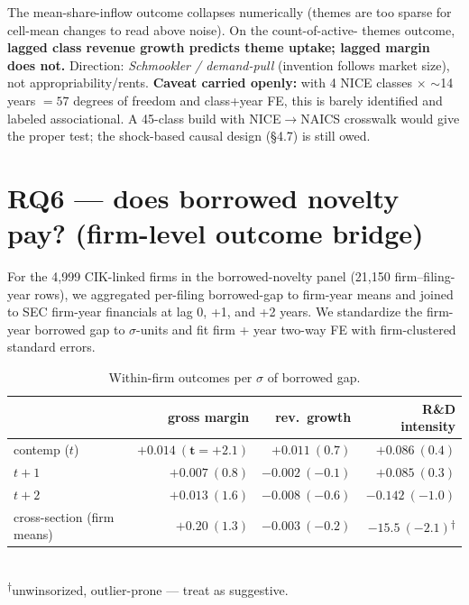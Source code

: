 \documentclass[11pt]{report}
\begin{document}
\noindent The mean-share-inflow outcome collapses numerically (themes are too
sparse for cell-mean changes to read above noise). On the count-of-active-
themes outcome, \textbf{lagged class revenue growth predicts theme uptake;
lagged margin does not.} Direction: \emph{Schmookler / demand-pull}
(invention follows market size), not appropriability/rents. \textbf{Caveat
carried openly:} with 4 NICE classes $\times$ $\sim$14 years $= 57$ degrees of
freedom and class+year FE, this is barely identified and labeled
associational. A 45-class build with NICE$\to$NAICS crosswalk would give the
proper test; the shock-based causal design (§4.7) is still owed.

\section{RQ6 --- does borrowed novelty pay? (firm-level outcome bridge)}
For the 4{,}999 CIK-linked firms in the borrowed-novelty panel (21{,}150
firm--filing-year rows), we aggregated per-filing borrowed-gap to firm-year
means and joined to SEC firm-year financials at lag 0, +1, and +2 years. We
standardize the firm-year borrowed gap to $\sigma$-units and fit firm + year
two-way FE with firm-clustered standard errors.

\begin{table}[h]\centering\small
\caption{Within-firm outcomes per $\sigma$ of borrowed gap.}
\begin{tabular}{lrrr}
\toprule
& gross margin & rev.\ growth & R\&D intensity \\
\midrule
contemp ($t$)   & $\mathbf{+0.014\ (t=+2.1)}$ & $+0.011\ (0.7)$ & $+0.086\ (0.4)$ \\
$t+1$           & $+0.007\ (0.8)$            & $-0.002\ (-0.1)$& $+0.085\ (0.3)$ \\
$t+2$           & $+0.013\ (1.6)$            & $-0.008\ (-0.6)$& $-0.142\ (-1.0)$ \\
\midrule
cross-section (firm means) & $+0.20\ (1.3)$  & $-0.003\ (-0.2)$ & $\mathbf{-15.5\ (-2.1)}$\textsuperscript{$\dagger$} \\
\bottomrule
\end{tabular}
\\[-2pt]
\textsuperscript{$\dagger$}\footnotesize unwinsorized, outlier-prone --- treat as suggestive.
\end{table}
\end{document}
